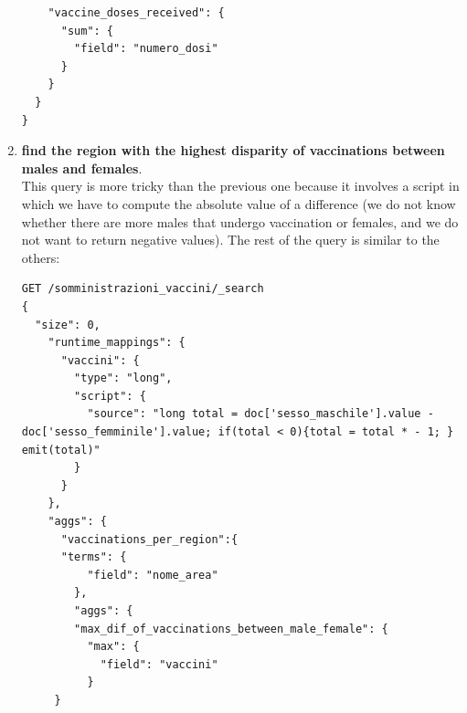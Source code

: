 \documentclass{article}
\begin{document}
\begin{enumerate}
\begin{lstlisting}
    "vaccine_doses_received": {
      "sum": {
        "field": "numero_dosi"
      }
    }
  }
}
\end{lstlisting}
\item \textbf{find the region with the highest disparity of vaccinations between males and females}.\\
This query is more tricky than the previous one because it involves a script in which we have to compute the absolute value of a difference (we do not know whether there are more males that undergo vaccination or females, and we do not want to return negative values). The rest of the query is similar to the others:
\begin{lstlisting}
GET /somministrazioni_vaccini/_search
{
  "size": 0,
    "runtime_mappings": {
      "vaccini": {
        "type": "long",
        "script": {
          "source": "long total = doc['sesso_maschile'].value - doc['sesso_femminile'].value; if(total < 0){total = total * - 1; } emit(total)"
        }
      }
    },
    "aggs": {
      "vaccinations_per_region":{
      "terms": {
          "field": "nome_area"
        },
        "aggs": {
        "max_dif_of_vaccinations_between_male_female": {
          "max": {
            "field": "vaccini"
          }
     }
          

\end{lstlisting}
\end{enumerate}
\end{document}
